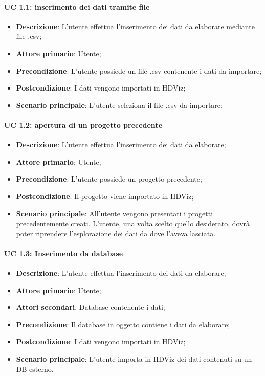 \paragraph{UC 1.1: inserimento dei dati tramite file}
\begin{itemize}
    \item{\textbf{Descrizione}}: L'utente effettua l'inserimento dei dati da elaborare mediante file .csv;
    \item{\textbf{Attore primario}}: Utente;
    \item{\textbf{Precondizione}}: L'utente possiede un file .csv contenente i dati da importare;
    \item{\textbf{Postcondizione}}: I dati vengono importati in HDViz;
    \item{\textbf{Scenario principale}}: L'utente seleziona il file .csv da importare;
\end{itemize}

\paragraph{UC 1.2: apertura di un progetto precedente}
\begin{itemize}
    \item{\textbf{Descrizione}}: L'utente effettua l'inserimento dei dati da elaborare;
    \item{\textbf{Attore primario}}: Utente;
    \item{\textbf{Precondizione}}: L'utente possiede un progetto precedente;
    \item{\textbf{Postcondizione}}: Il progetto viene importato in HDViz;
    \item{\textbf{Scenario principale}}: All'utente vengono presentati i progetti precedentemente creati. L'utente, una volta scelto quello desiderato, dovrà poter riprendere l'esplorazione dei dati da dove l'aveva lasciata.
\end{itemize}

\paragraph{UC 1.3: Inserimento da database}
\begin{itemize}
    \item{\textbf{Descrizione}}: L'utente effettua l'inserimento dei dati da elaborare;
    \item{\textbf{Attore primario}}: Utente;
    \item{\textbf{Attori secondari}}: Database contenente i dati;
    \item{\textbf{Precondizione}}: Il database in oggetto contiene i dati da elaborare;
    \item{\textbf{Postcondizione}}: I dati vengono importati in HDViz;
    \item{\textbf{Scenario principale}}: L'utente importa in HDViz dei dati contenuti su un DB esterno.
\end{itemize}
